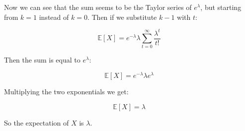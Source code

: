 Now we can see that the sum seems to be the Taylor series of $e^{\lambda}$, but
starting from $k = 1$ instead of $k = 0$. Then if we substitute $k - 1$ with $t$:

\singlespacing

\begin{equation}
    \mathbb{E}[X] = e^{-\lambda} \lambda \sum_{t=0}^{\infty} \frac{\lambda^{t}}{t!}
\end{equation}

\singlespacing

\break

Then the sum is equal to $e^{\lambda}$:

\singlespacing

\begin{equation}
    \mathbb{E}[X] = e^{-\lambda} \lambda e^{\lambda}
\end{equation}

\singlespacing

Multiplying the two exponentials we get:

\singlespacing

\begin{equation}
    \mathbb{E}[X] = \lambda
\end{equation}

\singlespacing

So the expectation of $X$ is $\lambda$.